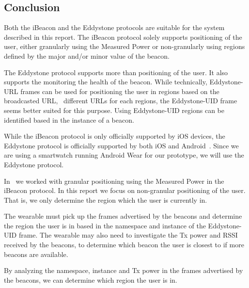 \subsection{Conclusion}

Both the iBeacon and the Eddystone protocols are suitable for the system described in this report. The iBeacon protocol solely supports positioning of the user, either granularly using the Measured Power or non-granularly using regions defined by the major and/or minor value of the beacon.

The Eddystone protocol supports more than positioning of the user. It also supports the monitoring the health of the beacon. While technically, Eddystone-URL frames can be used for positioning the user in regions based on the broadcasted URL, \ie~different URLs for each regions, the Eddystone-UID frame seems better suited for this purpose. Using Eddystone-UID regions can be identified based in the instance of a beacon.

While the iBeacon protocol is only officially supported by iOS devices, the Eddystone protocol is officially supported by both iOS and Android~\cite{estimote:what-is-eddystone}. Since we are using a smartwatch running Android Wear for our prototype, we will use the Eddystone protocol.

In~\cite{prespecialisation} we worked with granular positioning using the Measured Power in the iBeacon protocol. In this report we focus on non-granular positioning of the user. That is, we only determine the region which the user is currently in.

The wearable must pick up the frames advertised by the beacons and determine the region the user is in based in the namespace and instance of the Eddystone-UID frame. The wearable may also need to investigate the Tx power and RSSI received by the beacons, to determine which beacon the user is closest to if more beacons are available.

By analyzing the namespace, instance and Tx power in the frames advertised by the beacons, we can determine which region the user is in.


